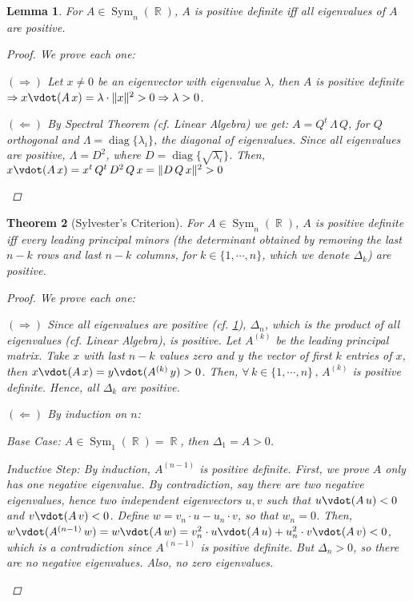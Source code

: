 \documentclass[12pt]{article}
\let\RA\Rightarrow
\let\LA\Leftarrow
\newcommand{\Forall}[1]{\forall\,{#1}\,,\,}
\DeclareMathOperator{\R}{\mathbb{R}}
\newtheorem{theorem}{Theorem}[subsection]
\newtheorem{lemma}[theorem]{Lemma}
\begin{document}
\begin{lemma}
  \label{definite_eigenvalues}
  For $A\in \operatorname{Sym}_n(\R)$, $A$ is positive definite iff all eigenvalues of $A$ are positive.
  \begin{proof}
    We prove each one:
    \begin{compactitem}
      \item[$(\RA)$] Let $x\neq 0$ be an eigenvector with eigenvalue $\lambda$, then $A$ is positive definite $\RA x\vdot(A\,x)=\lambda\cdot\|x\|^2>0\RA \lambda>0$.
      \item[$(\LA)$] By Spectral Theorem (cf. Linear Algebra) we get: $A=Q^t\,\Lambda\,Q$, for $Q$ orthogonal and $\Lambda=\operatorname{diag}\{\lambda_i\}$, the diagonal of eigenvalues. Since all eigenvalues are positive, $\Lambda=D^2$, where $D=\operatorname{diag}\{\sqrt{\lambda_i}\}$. Then, $x\vdot(A\,x)=x^t\,Q^t\,D^2\,Q\,x=\|D\,Q\,x\|^2>0$
    \end{compactitem}
  \end{proof}
\end{lemma}

\begin{theorem}[Sylvester's Criterion]
  For $A\in \operatorname{Sym}_n(\R)$, $A$ is positive definite iff every leading principal minors (the determinant obtained by removing the last $n-k$ rows and last $n-k$ columns, for $k\in\{1,\cdots,n\}$, which we denote $\Delta_k$) are positive.
  \begin{proof}
    We prove each one:
    \begin{compactitem}
      \item[$(\RA)$] Since all eigenvalues are positive (cf. \ref{definite_eigenvalues}), $\Delta_n$, which is the product of all eigenvalues (cf. Linear Algebra), is positive. Let $A^{(k)}$ be the leading principal matrix. Take $x$ with last $n-k$ values zero and $y$ the vector of first $k$ entries of $x$, then $x\vdot(A\,x)=y\vdot(A^{(k)}\,y)>0$. Then, $\Forall{k\in\{1,\cdots,n\}}A^{(k)}$ is positive definite. Hence, all $\Delta_k$ are positive.
      \item[$(\LA)$] By induction on $n$:
      \begin{compactitem}
        \item Base Case: $A\in \operatorname{Sym}_1(\R)=\R$, then $\Delta_1=A>0$.
        \item Inductive Step: By induction, $A^{(n-1)}$ is positive definite. First, we prove $A$ only has one negative eigenvalue. By contradiction, say there are two negative eigenvalues, hence two independent eigenvectors $u,v$ such that $u\vdot(A\,u)<0$ and $v\vdot(A\,v)<0$. Define $w=v_n\cdot u-u_n\cdot v$, so that $w_n=0$. Then, $w\vdot(A^{(n-1)}\,w)=w\vdot(A\,w)=v_n^2\cdot u\vdot(A\,u)+u_n^2\cdot v\vdot(A\,v)<0$, which is a contradiction since $A^{(n-1)}$ is positive definite. But $\Delta_n>0$, so there are no negative eigenvalues. Also, no zero eigenvalues.
      \end{compactitem}
    \end{compactitem}
  \end{proof}
\end{theorem}
\end{document}
